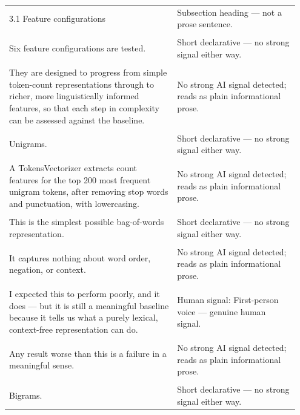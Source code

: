 \documentclass[11pt]{article}
\begin{document}
\begin{longtable}{|p{0.55\linewidth}|p{0.40\linewidth}|}
\hline
\rule{0pt}{3.5cm} & \\
\hline
3.1 Feature configurations & Subsection heading --- not a prose sentence. \\[2pt]
\hline
\rule{0pt}{3.5cm} & \\
\hline
Six feature configurations are tested. & Short declarative --- no strong signal either way. \\[2pt]
\hline
\rule{0pt}{3.5cm} & \\
\hline
They are designed to progress from simple token-count representations through to richer, more linguistically informed features, so that each step in complexity can be assessed against the baseline. & No strong AI signal detected; reads as plain informational prose. \\[2pt]
\hline
\rule{0pt}{3.5cm} & \\
\hline
Unigrams. & Short declarative --- no strong signal either way. \\[2pt]
\hline
\rule{0pt}{3.5cm} & \\
\hline
A TokensVectorizer extracts count features for the top 200 most frequent unigram tokens, after removing stop words and punctuation, with lowercasing. & No strong AI signal detected; reads as plain informational prose. \\[2pt]
\hline
\rule{0pt}{3.5cm} & \\
\hline
This is the simplest possible bag-of-words representation. & Short declarative --- no strong signal either way. \\[2pt]
\hline
\rule{0pt}{3.5cm} & \\
\hline
It captures nothing about word order, negation, or context. & No strong AI signal detected; reads as plain informational prose. \\[2pt]
\hline
\rule{0pt}{3.5cm} & \\
\hline
I expected this to perform poorly, and it does --- but it is still a meaningful baseline because it tells us what a purely lexical, context-free representation can do. & Human signal: First-person voice --- genuine human signal. \\[2pt]
\hline
\rule{0pt}{3.5cm} & \\
\hline
Any result worse than this is a failure in a meaningful sense. & No strong AI signal detected; reads as plain informational prose. \\[2pt]
\hline
\rule{0pt}{3.5cm} & \\
\hline
Bigrams. & Short declarative --- no strong signal either way. \\[2pt]

\end{longtable}
\end{document}
